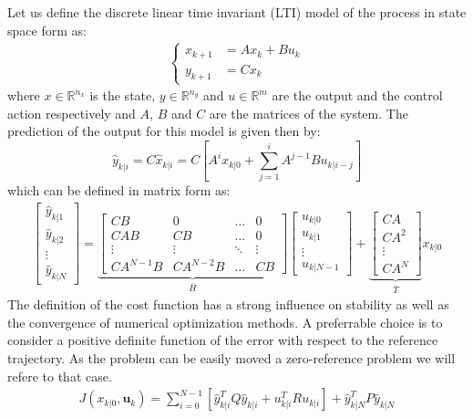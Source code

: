 Let us define the discrete linear time invariant (LTI) model of the process in state space form as:
\begin{equation} \label{system_evolution}
	\begin{split}
		\begin{cases}
			x_{k+1}&=Ax_k+Bu_k \\
			y_{k+1}&=Cx_k
		\end{cases}
	\end{split}
\end{equation}
where $x \in \mathbb{R}^{n_x}$ is the state, $y \in \mathbb{R}^{n_y}$ and $u \in \mathbb{R}^m$ are the output and the control action respectively and $A$, $B$ and $C$ are the matrices of the system. The prediction of the output for this model is given then by:
\begin{equation}\label{system_prediction}
	\hat{y}_{k|i}=C\hat{x}_{k|i}=C\left[A^i x_{k|0} + \sum_{j=1}^{i} A^{j-1}Bu_{k|i-j}\right]
\end{equation}
which can be defined in matrix form as: 
\begin{equation}
\begin{split}\label{system_prediction1}
	\left[ \begin{matrix} \hat{y}_{k|1} \\ \hat{y}_{k|2} \\ \vdots \\ \hat{y}_{k|N} \end{matrix} \right] = \underbrace{\left[ \begin{matrix}
	CB		 & 	0	    &	\dots	&	0 		\\
	CAB		 & 	CB	    &	\dots	&	0 		\\
	\vdots	 &  \vdots  &	\ddots	&	\vdots	\\
	CA^{N-1}B & CA^{N-2}B &   \dots   &	CB			
	\end{matrix}\right]}_{\bar{H}}\left[ \begin{matrix} u_{k|0} \\ u_{k|1} \\ \vdots \\ u_{k|N-1} \end{matrix} \right]+ \underbrace{\left[ \begin{matrix} CA \\ CA^2 \\ \vdots \\ CA^N \end{matrix} \right]}_{\bar{T}}x_{k|0}
	\end{split}	
\end{equation}
The definition of the cost function has a strong influence on stability as well as the convergence of numerical optimization methods. A preferrable choice is to consider a positive definite function of the error with respect to the reference trajectory. As the problem can be easily moved a zero-reference problem we will refere to that case. 
\begin{equation} \label{costfunction}
	\begin{split}
		J(x_{k|0},\textbf{u}_k) = \sum_{i=0}^{N-1} \left[\hat{y}_{k|i}^T Q \hat{y}_{k|i} + u_{k|i}^TRu_{k|i} \right] + \hat{y}_{k|N}^T P \hat{y}_{k|N}
	\end{split}	
\end{equation}

